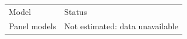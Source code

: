 ﻿\begin{tabular}{ll}
Model & Status\\
Panel models & Not estimated: data unavailable\\
\end{tabular}
